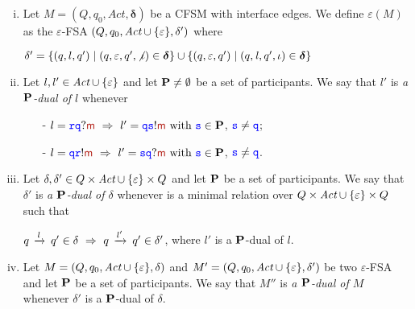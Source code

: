 \begin{definition}\label{def:PD}%
\begin{enumerate}[i)]
\item
Let $M=(Q,q_0,\textit{Act},\bm{\delta})$ be a CFSM with interface edges. We define
$\varepsilon(M)$ as  the $\varepsilon$-FSA $(Q,q_0,\textit{Act}\cup\{\varepsilon\},\delta')$   where\\
\centerline{
$\delta' = \{(q,l,q') \mid (q,\varepsilon,q',\not\iota) \in \bm{\delta}\}\cup \{(q,\varepsilon,q') \mid (q,\mathit{l},q',\iota) \in \bm{\delta}\}$  }
\item
Let $l,l'\in\textit{Act}\cup\{\varepsilon\}$ and  let $\mathbf{P}\neq\emptyset$ be a set of participants.
We say that $l'$ is {\em a $\mathbf{P}$-dual of $l$} whenever 
\begin{itemize}
\item[-]
$l = \ttr\ttq?\msg[m] \implies l'= \ttq\tts!\msg[m] \text{ with } \tts\in\roles$, ${\mathtt{\color{blue}{ {s}}}}\neq{ \ensuremath{\mathtt{\color{blue}{ {q}}}} }$;
\item[-]
$l = \ttq\ttr!\msg[m] \implies l'= \tts\ttq?\msg[m] \text{ with } \tts\in\roles$, ${\mathtt{\color{blue}{ {s}}}}\neq{ \ensuremath{\mathtt{\color{blue}{ {q}}}} }$.
\end{itemize}
\item
Let $\delta,\delta'\in Q\times\textit{Act}\cup\{\varepsilon\}\times Q$ and  let $\mathbf{P}$ be a set of participants.
We say that $\delta'$ is {\em a $\mathbf{P}$-dual of $\delta$} whenever is a minimal relation over
 $Q\times\textit{Act}\cup\{\varepsilon\}\times Q$ such that\\
\centerline{
$q\,\xrightarrow{l}_{{}}\,q'\in\delta ~\Rightarrow~ q\,\xrightarrow{l'}_{{}}\,q'\in\delta'$, where $l'$ is a $\mathbf{P}$-dual of $l$.
}
\item
Let $M=(Q,q_0,\textit{Act}\cup\{\varepsilon\},\delta)$ and $M'=(Q,q_0,\textit{Act}\cup\{\varepsilon\},\delta')$ be two $\varepsilon$-FSA and  let $\mathbf{P}$ be a set of participants.
We say that $M''$ is {\em a $\mathbf{P}$-dual of $M$} whenever $\delta'$ is a $\mathbf{P}$-dual of $\delta$.
\end{enumerate}
\end{definition}

